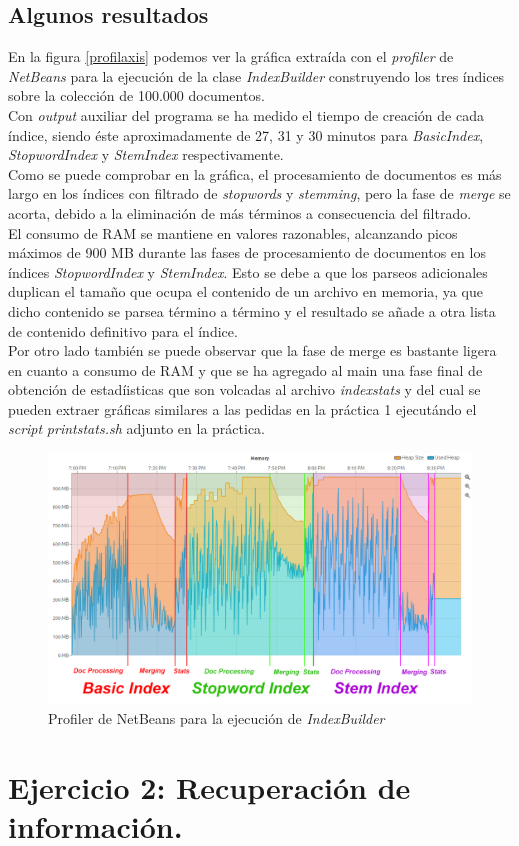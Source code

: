 \documentclass[spanish]{assignment}
\begin{document}
	\subsection{Algunos resultados}
	En la figura \ref{profilaxis} podemos ver la gráfica extraída con el \textit{profiler} de \textit{NetBeans} para la ejecución de la clase \textit{IndexBuilder} construyendo los tres índices sobre la colección de 100.000 documentos.\\
	
	Con \textit{output} auxiliar del programa se ha medido el tiempo de creación de cada índice, siendo éste aproximadamente de 27, 31 y 30 minutos para \textit{BasicIndex}, \textit{StopwordIndex} y \textit{StemIndex} respectivamente.\\
	
	Como se puede comprobar en la gráfica, el procesamiento de documentos es más largo en los índices con filtrado de \textit{stopwords} y \textit{stemming}, pero la fase de \textit{merge} se acorta, debido a la eliminación de más términos a consecuencia del filtrado.\\
	
	El consumo de RAM se mantiene en valores razonables, alcanzando picos máximos de 900 MB durante las fases de procesamiento de documentos en los índices \textit{StopwordIndex} y \textit{StemIndex}. Esto se debe a que los parseos adicionales duplican el tamaño que ocupa el contenido de un archivo en memoria, ya que dicho contenido se parsea término a término y el resultado se añade a otra lista de contenido definitivo para el índice.\\
	
	Por otro lado también se puede observar que la fase de merge es bastante ligera en cuanto a consumo de RAM y que se ha agregado al main una fase final de obtención de estadíisticas que son volcadas al archivo \textit{indexstats} y del cual se pueden extraer gráficas similares a las pedidas en la práctica 1 ejecutándo el \textit{script} \textit{printstats.sh} adjunto en la práctica.

	\begin{landscape}\label{profilaxis}
		\begin{figure}
			\centering
			\includegraphics[width=1.8\textwidth]{profilaxis.png}
			\caption{Profiler de NetBeans para la ejecución de \textit{IndexBuilder}}
		\end{figure}
	\end{landscape}
	
	\section{Ejercicio 2: Recuperación de información.}
	
\end{document}
